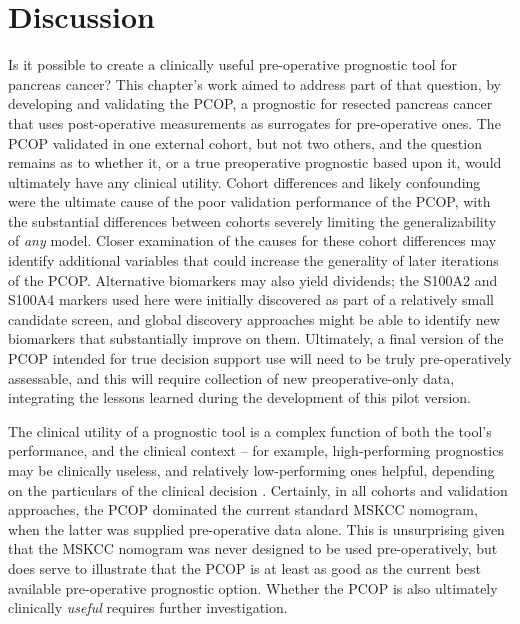 \documentclass[dissertation.tex]{subfiles}
\begin{document}
\section{Discussion}
Is it possible to create a clinically useful pre-operative prognostic tool for pancreas cancer?  This chapter's work aimed to address part of that question, by developing and validating the \gls{PCOP}, a prognostic for resected pancreas cancer that uses post-operative measurements as surrogates for pre-operative ones.  The \gls{PCOP} validated in one external cohort, but not two others, and the question remains as to whether it, or a true preoperative prognostic based upon it, would ultimately have any clinical utility.  Cohort differences and likely confounding were the ultimate cause of the poor validation performance of the \gls{PCOP}, with the substantial differences between cohorts severely limiting the generalizability of \emph{any} model.  Closer examination of the causes for these cohort differences may identify additional variables that could increase the generality of later iterations of the \gls{PCOP}.  Alternative biomarkers may also yield dividends; the S100A2 and S100A4 markers used here were initially discovered as part of a relatively small candidate screen, and global discovery approaches might be able to identify new biomarkers that substantially improve on them.  Ultimately, a final version of the \gls{PCOP} intended for true decision support use will need to be truly pre-operatively assessable, and this will require collection of new preoperative-only data, integrating the lessons learned during the development of this pilot version.

The clinical utility of a prognostic tool is a complex function of both the tool's performance, and the clinical context -- for example, high-performing prognostics may be clinically useless, and relatively low-performing ones helpful, depending on the particulars of the clinical decision \cite{Vickers2010}.  Certainly, in all cohorts and validation approaches, the \gls{PCOP} dominated the current standard \gls{MSKCC} nomogram, when the latter was supplied pre-operative data alone.  This is unsurprising given that the \gls{MSKCC} nomogram was never designed to be used pre-operatively, but does serve to illustrate that the \gls{PCOP} is at least as good as the current best available pre-operative prognostic option.  Whether the \gls{PCOP} is also ultimately clinically \emph{useful} requires further investigation.
\end{document}
